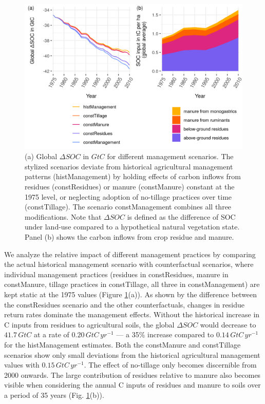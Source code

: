 \documentclass[gc, manuscript]{copernicus}
\begin{document}
\begin{figure}[h]
\includegraphics[width=14cm]{../ResultNotebooks/Output/Images/scenario_horiz} \caption{(a) Global $\Delta SOC$ in $\unit{GtC}$ for different management scenarios. The stylized scenarios deviate from historical agricultural management patterns (histManagement) by holding effects of carbon inflows from residues (constResidues) or manure (constManure) constant at the 1975 level, or neglecting adoption of no-tillage practices over time (constTillage). The scenario constManagement combines all three modifications. Note that $\Delta SOC$ is defined as the difference of SOC under land-use compared to a hypothetical natural vegetation state. Panel (b) shows the carbon inflows from crop residue and manure.}\label{fig:SOCscen}
\end{figure}

We analyze the relative impact of different management practices by comparing the actual historical management scenario with counterfactual scenarios, where individual management practices (residues in constResidues, manure in constManure, tillage practices in constTillage, all three in constManagement) are kept static at the 1975 values (Figure \ref{fig:SOCscen}(a)). As shown by the difference between the constResidues scenario and the other counterfactuals, changes in residue return rates dominate the management effects. Without the historical increase in C inputs from residues to agricultural soils, the global \(\Delta SOC\) would decrease to \(41.7\,\unit{GtC}\) at a rate of \(0.20\,\unit{GtC\,yr^{-1}}\) --- a 35\% increase compared to \(0.14\,\unit{GtC\,yr^{-1}}\) for the histManagement estimates. Both the constManure and constTillage scenarios show only small deviations from the historical agricultural management values with \(0.15\,\unit{GtC\,yr^{-1}}\). The effect of no-tillage only becomes discernible from 2000 onwards.
The large contribution of residues relative to manure also becomes visible when considering the annual C inputs of residues and manure to soils over a period of 35 years (Fig. \ref{fig:SOCscen}(b)).
\end{document}
